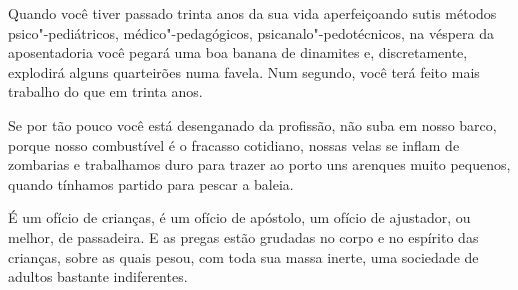 \pagebreak

Quando você tiver passado trinta anos da sua vida aperfeiçoando sutis
métodos psico"-pediátricos, médico"-pedagógicos, psicanalo"-pedotécnicos,
na véspera da aposentadoria você pegará uma boa banana de dinamites e,
discretamente, explodirá alguns quarteirões numa favela. Num segundo,
você terá feito mais trabalho do que em trinta anos.

\bigskip
\bigskip

Se por tão pouco você está desenganado da profissão, não suba em nosso
barco, porque nosso combustível é o fracasso cotidiano, nossas velas se
inflam de zombarias e trabalhamos duro para trazer ao porto uns arenques
muito pequenos, quando tínhamos partido para pescar a baleia.

\bigskip
\bigskip

É um ofício de crianças, é um ofício de apóstolo, um ofício de
ajustador, ou melhor, de passadeira. E as pregas estão grudadas no corpo
e no espírito das crianças, sobre as quais pesou, com toda sua massa
inerte, uma sociedade de adultos bastante indiferentes.

\pagebreak
\thispagestyle{empty}